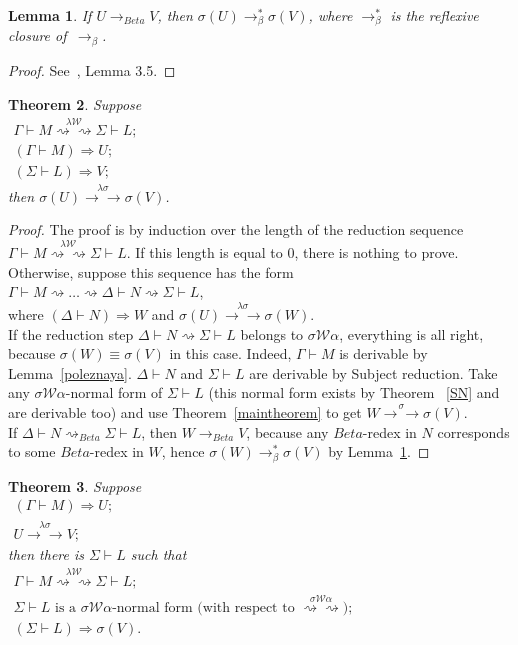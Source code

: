\documentclass[11pt]{amsart}
\theoremstyle{plain}
\newtheorem{theorem}{Theorem}[section]
\newtheorem{lemma}[theorem]{Lemma}
\theoremstyle{definition}
\theoremstyle{remark}
\numberwithin{equation}{section}
\newcommand{\ri}{\rightsquigarrow}
\newcommand{\arrow}{\rightarrow}
\newcommand{\twoh}{\arrow\arrow}
\renewcommand{\pi}{\mathcal{W}}
\begin{document}
\begin{lemma}\label{lemmapodjom}If $U\arrow_{Beta}V$, then
$\sigma(U)\arrow^*_{\beta}\sigma(V)$, where $\arrow^*_{\beta}$ is
the reflexive closure of $\,\arrow_{\beta}$.
\end{lemma}
\begin{proof}See~\cite{Abadi}, Lemma 3.5.
\end{proof}
\begin{theorem}\label{theorem33}Suppose \\
$\begin{array}{l}
 \Gamma\vdash M\overset{\lambda\pi}{\ri\ri}\Sigma\vdash
L;\\
 (\Gamma\vdash M)\boldsymbol{\Rightarrow} U;\\
 (\Sigma\vdash L)\boldsymbol{\Rightarrow} V;
\end{array}$\\[5pt]
then $\sigma(U)\overset{\lambda\sigma}{\twoh}\sigma(V)$.
\end{theorem}
\begin{proof}The proof is by induction over the length of the reduction sequence $\Gamma\vdash M\overset{\lambda\pi}{\ri\ri}\Sigma\vdash
L$.  If this length is equal to $0$, there is nothing to prove.
Otherwise, suppose this sequence has the form
\\
$\Gamma\vdash M\ri\ldots\ri\Delta\vdash N\ri\Sigma\vdash L$,\\
where
$(\Delta\vdash N)\boldsymbol{\Rightarrow}  W$ and  $\sigma(U)\overset{\lambda\sigma}{\twoh}\sigma(W)$.\\
If the reduction step $\Delta\vdash N\ri\Sigma\vdash L$ belongs to
$\sigma\pi\alpha$, everything is all right, because
$\sigma(W)\equiv\sigma(V)$ in this case. Indeed, $\Gamma\vdash M$
is derivable by Lemma~\ref{poleznaya}. $\Delta\vdash N$ and
$\Sigma\vdash L$ are derivable by Subject
reduction. Take any $\sigma\pi\alpha$-normal form of $\Sigma\vdash L$ (this normal form exists by Theorem ~\ref{SN} and are derivable too) and use Theorem~\ref{maintheorem} to get $ W\overset{\sigma}{\twoh}\sigma(V)$.\\
If $\Delta\vdash N\ri_{Beta}\Sigma\vdash L$, then
$W\arrow_{Beta}V$, because any $Beta$-redex in $N$ corresponds to
some $Beta$-redex in $W$, hence
$\sigma(W)\arrow^*_{\beta}\sigma(V)$ by Lemma~\ref{lemmapodjom}.
\end{proof}
\begin{theorem}\label{theorem44}Suppose \\
$\begin{array}{l}
 (\Gamma\vdash M) \boldsymbol{\Rightarrow}  U;\\
 U\overset{\lambda\sigma}{\twoh}V;
\end{array}$\\
then there is $\Sigma\vdash L$ such that\\
$\begin{array}{l}
 \Gamma\vdash M\overset{\lambda\pi}{\ri\ri}\Sigma\vdash L;\\
 \Sigma\vdash L \text{ is a } \sigma\pi\alpha\text{-normal
form (with respect to $\overset{\sigma\pi\alpha}{\ri\ri}$)};\\
  (\Sigma\vdash
L)\boldsymbol{\Rightarrow}\sigma(V).
 \end{array}$
 \end{theorem}
\end{document}

